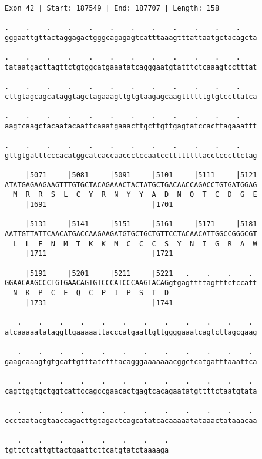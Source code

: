 \documentclass{article}
\begin{document}
\begin{Verbatim}[fontfamily=courier]
Exon 42 | Start: 187549 | End: 187707 | Length: 158

.    .    .    .    .    .    .    .    .    .    .    .    
gggaattgttactaggagactgggcagagagtcatttaaagtttattaatgctacagcta

.    .    .    .    .    .    .    .    .    .    .    .    
tataatgacttagttctgtggcatgaaatatcagggaatgtatttctcaaagtcctttat

.    .    .    .    .    .    .    .    .    .    .    .    
cttgtagcagcataggtagctagaaagttgtgtaagagcaagttttttgtgtccttatca

.    .    .    .    .    .    .    .    .    .    .    .    
aagtcaagctacaatacaattcaaatgaaacttgcttgttgagtatccacttagaaattt

.    .    .    .    .    .    .    .    .    .    .    .    
gttgtgatttcccacatggcatcaccaaccctccaatccttttttttacctcccttctag

     |5071     |5081     |5091     |5101     |5111     |5121
ATATGAGAAGAAGTTTGTGCTACAGAAACTACTATGCTGACAACCAGACCTGTGATGGAG
  M  R  R  S  L  C  Y  R  N  Y  Y  A  D  N  Q  T  C  D  G  E
     |1691                         |1701                    

     |5131     |5141     |5151     |5161     |5171     |5181
AATTGTTATTCAACATGACCAAGAAGATGTGCTGCTGTTCCTACAACATTGGCCGGGCGT
  L  L  F  N  M  T  K  K  M  C  C  C  S  Y  N  I  G  R  A  W
     |1711                         |1721                    

     |5191     |5201     |5211     |5221   .    .    .    . 
GGAACAAGCCCTGTGAACAGTGTCCCATCCCAAGTACAGgtgagttttagtttctccatt
  N  K  P  C  E  Q  C  P  I  P  S  T  D                     
     |1731                         |1741                    

   .    .    .    .    .    .    .    .    .    .    .    . 
atcaaaaatataggttgaaaaattacccatgaattgttggggaaatcagtcttagcgaag

   .    .    .    .    .    .    .    .    .    .    .    . 
gaagcaaagtgtgcattgtttatctttacagggaaaaaaacggctcatgatttaaattca

   .    .    .    .    .    .    .    .    .    .    .    . 
cagttggtgctggtcattccagccgaacactgagtcacagaatatgttttctaatgtata

   .    .    .    .    .    .    .    .    .    .    .    . 
ccctaatacgtaaccagacttgtagactcagcatatcacaaaaatataaactataaacaa

   .    .    .    .    .    .    .    .
tgttctcattgttactgaattcttcatgtatctaaaaga
\end{Verbatim}
\end{document}
